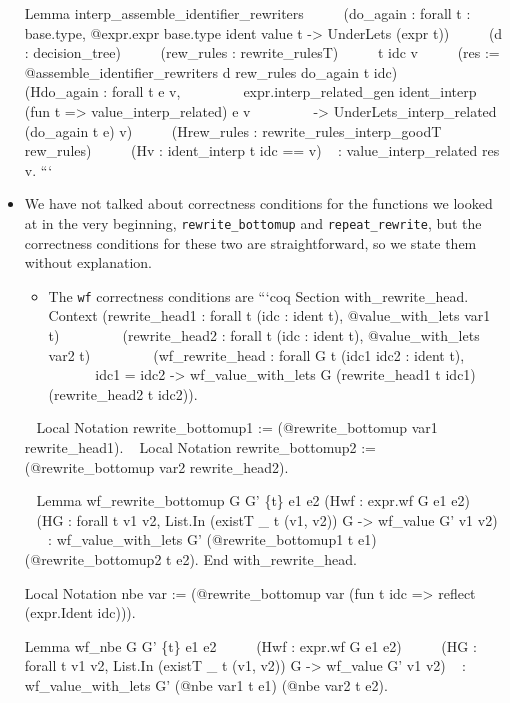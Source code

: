 \begin{itemize}
  Lemma interp\_assemble\_identifier\_rewriters ~ ~ ~ (do\_again :
  forall t : base.type, @expr.expr base.type ident value t
  -\textgreater{} UnderLets (expr t)) ~ ~ ~ (d : decision\_tree) ~ ~ ~
  (rew\_rules : rewrite\_rulesT) ~ ~ ~ t idc v ~ ~ ~ (res :=
  @assemble\_identifier\_rewriters d rew\_rules do\_again t idc) ~ ~ ~
  (Hdo\_again : forall t e v, ~ ~ ~ ~ ~ expr.interp\_related\_gen
  ident\_interp (fun t =\textgreater{} value\_interp\_related) e v ~ ~ ~
  ~ ~ -\textgreater{} UnderLets\_interp\_related (do\_again t e) v) ~ ~
  ~ (Hrew\_rules : rewrite\_rules\_interp\_goodT rew\_rules) ~ ~ ~ (Hv :
  ident\_interp t idc == v) ~ : value\_interp\_related res v. ```
\item
  We have not talked about correctness conditions for the functions we
  looked at in the very beginning, \texttt{rewrite\_bottomup} and
  \texttt{repeat\_rewrite}, but the correctness conditions for these two
  are straightforward, so we state them without explanation.

  \begin{itemize}
  \tightlist
  \item
    The \texttt{wf} correctness conditions are ```coq Section
    with\_rewrite\_head. ~ Context (rewrite\_head1 : forall t (idc :
    ident t), @value\_with\_lets var1 t) ~ ~ ~ ~ ~ (rewrite\_head2 :
    forall t (idc : ident t), @value\_with\_lets var2 t) ~ ~ ~ ~ ~
    (wf\_rewrite\_head : forall G t (idc1 idc2 : ident t), ~ ~ ~ ~ ~ ~ ~
    idc1 = idc2 -\textgreater{} wf\_value\_with\_lets G (rewrite\_head1
    t idc1) (rewrite\_head2 t idc2)).
  \end{itemize}

  ~ Local Notation rewrite\_bottomup1 := (@rewrite\_bottomup var1
  rewrite\_head1). ~ Local Notation rewrite\_bottomup2 :=
  (@rewrite\_bottomup var2 rewrite\_head2).

  ~ Lemma wf\_rewrite\_bottomup G G' \{t\} e1 e2 (Hwf : expr.wf G e1 e2)
  ~ ~ ~ ~ (HG : forall t v1 v2, List.In (existT \_ t (v1, v2)) G
  -\textgreater{} wf\_value G' v1 v2) ~ ~ : wf\_value\_with\_lets G'
  (@rewrite\_bottomup1 t e1) (@rewrite\_bottomup2 t e2). End
  with\_rewrite\_head.

  Local Notation nbe var := (@rewrite\_bottomup var (fun t idc
  =\textgreater{} reflect (expr.Ident idc))).

  Lemma wf\_nbe G G' \{t\} e1 e2 ~ ~ ~ (Hwf : expr.wf G e1 e2) ~ ~ ~ (HG
  : forall t v1 v2, List.In (existT \_ t (v1, v2)) G -\textgreater{}
  wf\_value G' v1 v2) ~ : wf\_value\_with\_lets G' (@nbe var1 t e1)
  (@nbe var2 t e2).


\end{itemize}
